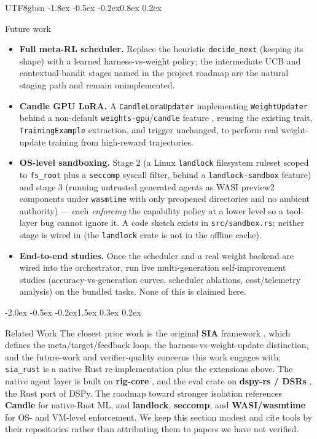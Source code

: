 \documentclass{article}
\makeatletter
\renewcommand{\section}{\@startsection{section}{1}{\z@}%
  {-2.0ex \@plus -0.5ex \@minus -0.2ex}{1.5ex \@plus 0.3ex \@minus 0.2ex}%
  {\large\bfseries\raggedright\color{accent}}}
\renewcommand{\subsection}{\@startsection{subsection}{2}{\z@}%
  {-1.8ex \@plus -0.5ex \@minus -0.2ex}{0.8ex \@plus 0.2ex}%
  {\normalsize\bfseries\raggedright\color{accent}}}
\makeatother
\begin{document}
\begin{CJK}{UTF8}{gbsn}
\subsection{Future work}
\label{sec:future}
\begin{itemize}
\item \textbf{Full meta-RL scheduler.} Replace the heuristic \texttt{decide\_next}
  (keeping its shape) with a learned harness-vs-weight policy; the intermediate UCB
  and contextual-bandit stages named in the project roadmap are the natural staging
  path and remain unimplemented.
\item \textbf{Candle GPU LoRA.} A \texttt{CandleLoraUpdater} implementing
  \texttt{WeightUpdater} behind a non-default \texttt{weights-gpu}/\texttt{candle}
  feature \citep{candle}, reusing the existing trait, \texttt{TrainingExample}
  extraction, and trigger unchanged, to perform real weight-update training from
  high-reward trajectories.
\item \textbf{OS-level sandboxing.} Stage 2 (a Linux \texttt{landlock} filesystem
  ruleset scoped to \texttt{fs\_root} plus a \texttt{seccomp} syscall filter, behind
  a \texttt{landlock-sandbox} feature) and stage 3 (running untrusted generated
  agents as WASI preview2 components under \texttt{wasmtime} \citep{wasmtime} with
  only preopened directories and no ambient authority) --- each \emph{enforcing} the
  capability policy at a lower level so a tool-layer bug cannot ignore it. A code
  sketch exists in \texttt{src/sandbox.rs}; neither stage is wired in (the
  \texttt{landlock} crate is not in the offline cache).
\item \textbf{End-to-end studies.} Once the scheduler and a real weight backend are
  wired into the orchestrator, run live multi-generation self-improvement studies
  (accuracy-vs-generation curves, scheduler ablations, cost/telemetry analysis) on
  the bundled tasks. None of this is claimed here.
\end{itemize}

\section{Related Work}
The closest prior work is the original \textbf{SIA} framework
\citep{hebbar2026sia}, which defines the meta/target/feedback loop, the
harness-vs-weight-update distinction, and the future-work and verifier-quality
concerns this work engages with; \texttt{sia\_rust} is a native Rust
re-implementation plus the extensions above. The native agent layer is built on
\textbf{rig-core} \citep{rigcore}, and the eval crate on \textbf{dspy-rs / DSRs}
\citep{dsrs}, the Rust port of DSPy. The roadmap toward stronger isolation references
\textbf{Candle} \citep{candle} for native-Rust ML, and \textbf{landlock},
\textbf{seccomp}, and \textbf{WASI/wasmtime} \citep{wasmtime} for OS- and VM-level
enforcement. We keep this section modest and cite tools by their repositories rather
than attributing them to papers we have not verified.


\end{CJK}
\end{document}
